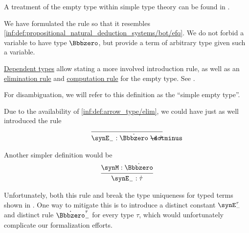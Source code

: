 \begin{comments}
  \item A treatment of the empty type within simple type theory can be found in \cite[\S 4.3.4]{Mimram2020ProgramEqualsProof}.

  \item We have formulated the rule so that it resembles \ref{inf:def:propositional_natural_deduction_systems/bot/efq}. We do not forbid a variable to have type \( \syn\Bbbzero \), but provide a term of arbitrary type given such a variable.

  \item \hyperref[con:dependent_type]{Dependent types} allow stating a more involved introduction rule, as well as an \hyperref[rem:type_theory_rule_classification/intro]{elimination rule} and \hyperref[rem:type_theory_rule_classification/equality/comp]{computation rule} for the empty type. See .

  For disambiguation, we will refer to this definition as the \enquote{simple empty type}.

  \item Due to the availability of \ref{inf:def:arrow_type/elim}, we could have just as well introduced the rule
  \begin{equation*}
    \begin{prooftree}
      \infer0{ \synE_-: \syn\Bbbzero \synimplies \syn\tau }
    \end{prooftree}
  \end{equation*}

  Another simpler definition would be
  \begin{equation*}
    \begin{prooftree}
      \hypo{ \synM: \syn\Bbbzero }
      \infer1{ \synE_-: \syn\tau }
    \end{prooftree}
  \end{equation*}

  Unfortunately, both this rule and break the type uniqueness for typed terms shown in . One way to mitigate this is to introduce a distinct constant \( \synE_-^\tau \) and distinct rule \( \syn\Bbbzero_-^\tau \) for every type \( \tau \), which would unfortunately complicate our formalization efforts.
\end{comments}

